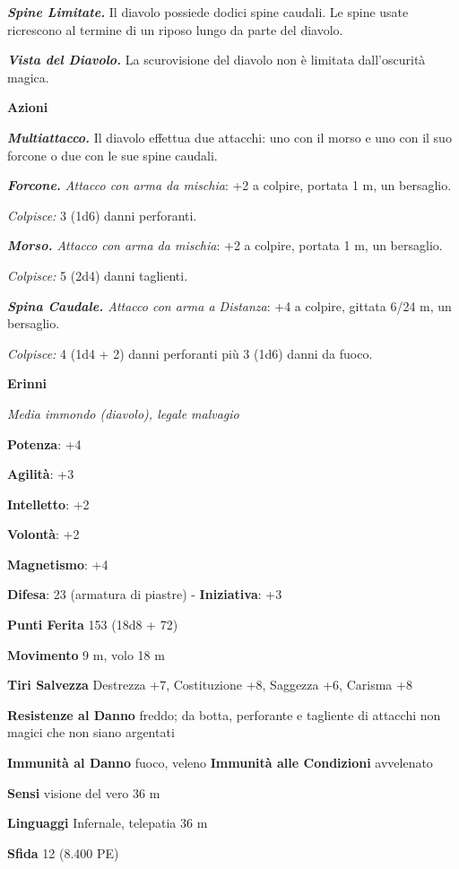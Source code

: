 \begin{multicols}{2}
\emph{\textbf{Spine Limitate.}} Il diavolo possiede dodici spine
caudali. Le spine usate ricrescono al termine di un riposo lungo da
parte del diavolo.

\emph{\textbf{Vista del Diavolo.}} La scurovisione del diavolo non è
limitata dall'oscurità magica.

\smallskip\textbf{Azioni}

\emph{\textbf{Multiattacco.}} Il diavolo effettua due attacchi: uno con
il morso e uno con il suo forcone o due con le sue spine caudali.

\emph{\textbf{Forcone.} Attacco con arma da mischia}: +2 a colpire,
portata 1 m, un bersaglio.

\emph{Colpisce:} 3 (1d6) danni perforanti.

\emph{\textbf{Morso.} Attacco con arma da mischia}: +2 a colpire,
portata 1 m, un bersaglio.

\emph{Colpisce:} 5 (2d4) danni taglienti.

\emph{\textbf{Spina Caudale.} Attacco con arma a Distanza}: +4 a
colpire, gittata 6/24 m, un bersaglio.

\emph{Colpisce:} 4 (1d4 + 2) danni perforanti più 3 (1d6) danni da
fuoco.

\textbf{Erinni}

\emph{Media immondo (diavolo), legale malvagio}

\textbf{Potenza}: +4

\textbf{Agilità}: +3

\textbf{Intelletto}: +2

\textbf{Volontà}: +2

\textbf{Magnetismo}: +4

\textbf{Difesa}: 23 (armatura di piastre) - \textbf{Iniziativa}: +3

\textbf{Punti Ferita} 153 (18d8 + 72)

\textbf{Movimento} 9 m, volo 18 m

\textbf{Tiri Salvezza} Destrezza +7, Costituzione +8, Saggezza +6,
Carisma +8

\textbf{Resistenze al Danno} freddo; da botta, perforante e tagliente
di attacchi non magici che non siano argentati

\textbf{Immunità al Danno} fuoco, veleno \textbf{Immunità alle
Condizioni} avvelenato

\textbf{Sensi} visione del vero 36 m

\textbf{Linguaggi} Infernale, telepatia 36 m 

\textbf{Sfida} 12 (8.400 PE)\smallskip


\end{multicols}
